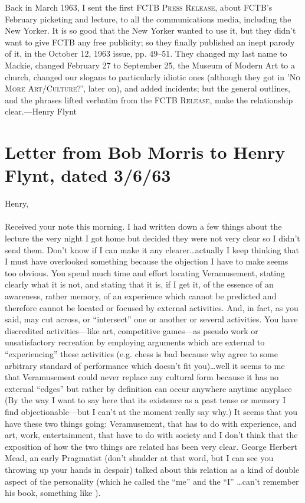 Back in March 1963, I sent the first \textsc{FCTB Press Release}, about FCTB's 
February picketing and lecture, to all the communications media, including 
the New Yorker. It is so good that the New Yorker wanted to use it, but 
they didn't want to give FCTB any free publicity; so they finally published 
an inept parody of it, in the October 12, 1963 issue, pp. 49--51. They 
changed my last name to Mackie, changed February 27 to September 25, the 
Museum of Modern Art to a church, changed our slogans to particularly 
idiotic ones (although they got in '\textsc{No More Art/Culture?}', later on), 
and added incidents; but the general outlines, and the phrases lifted verbatim 
from the \textsc{FCTB Release}, make the relationship clear.---Henry Flynt 

\clearpage

\section*{{\normalsize Letter from Bob Morris to Henry Flynt, dated 3/6/63}}


\vfill 

\noindent
Henry, \\
\\
Received your note this morning. I had written down a few things about the 
lecture the very night I got home but decided they were not very clear so I 
didn't send them. Don't know if I can make it any clearer\ldots actually I keep 
thinking that I must have overlooked something because the objection I have 
to make seems too obvious. You spend much time and effort locating 
Veramusement, stating clearly what it is not, and stating that it is, if I get it, 
of the essence of an awareness, rather memory, of an experience which 
cannot be predicted and therefore cannot be located or focused by external 
activities. And, in fact, as you said, may cut across, or \enquote{intersect} one or 
another or several activities. You have discredited activities---like art, 
competitive games---as pseudo work or unsatisfactory recreation by employing 
arguments which are external to \enquote{experiencing} these activities (e.g. chess is 
bad because why agree to some arbitrary standard of performance which 
doesn't fit you)\ldots well it seems to me that Veramusement could never replace 
any cultural form because it has no external \enquote{edges} but rather by definition 
can occur anywhere anytime anyplace (By the way I want to say here that 
its existence as a past tense or memory I find objectionable---but I can't at the 
moment really say why.) It seems that you have these two things going: 
Veramusement, that has to do with experience, and art, work, 
entertainment, that have to do with society and I don't think that the 
exposition of how the two things are related has been very clear. George 
Herbert Mead, an early Pragmatist (don't shudder at that word, but I can see 
you throwing up your hands in despair) talked about this relation as a kind 
of double aspect of the personality (which he called the \enquote{me} and the \enquote{I} 
\ldots can't remember his book, something like ). 


